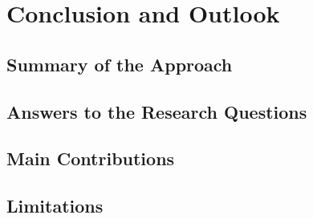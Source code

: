 \chapter{Conclusion and Outlook}
\label{chap:conclusion}

\section{Summary of the Approach}
\label{sec:concl:summary}

\section{Answers to the Research Questions}
\label{sec:concl:answers}

\section{Main Contributions}
\label{sec:concl:contributions}

\section{Limitations}
\label{sec:concl:limitations}

